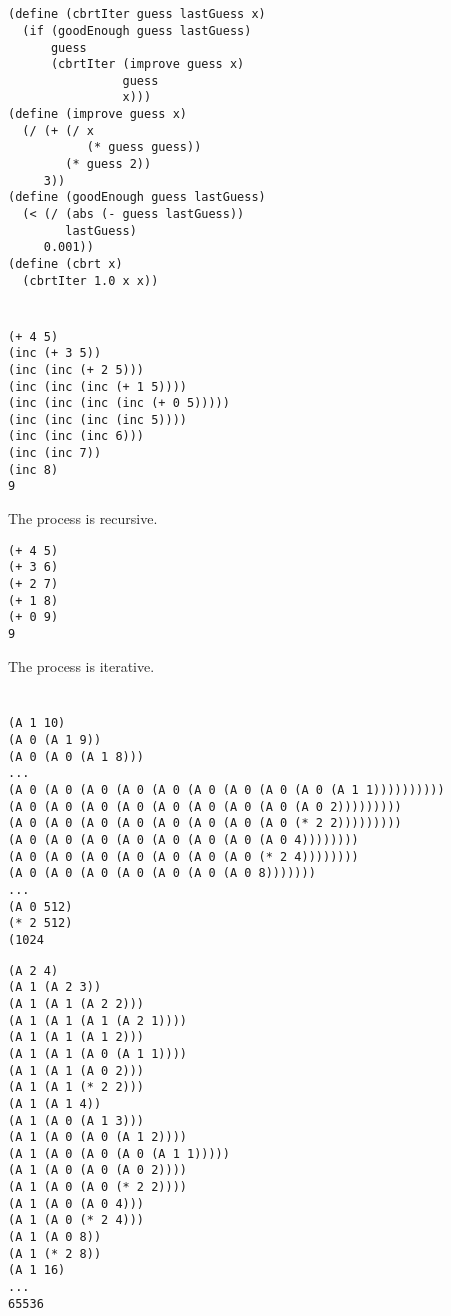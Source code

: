 \documentclass[a4paper]{report}
\begin{document}

\section{}

\begin{lstlisting}
(define (cbrtIter guess lastGuess x)
  (if (goodEnough guess lastGuess)
      guess
      (cbrtIter (improve guess x)
                guess
                x)))
(define (improve guess x)
  (/ (+ (/ x
           (* guess guess))
        (* guess 2))
     3))
(define (goodEnough guess lastGuess)
  (< (/ (abs (- guess lastGuess))
        lastGuess)
     0.001))
(define (cbrt x)
  (cbrtIter 1.0 x x))
\end{lstlisting}


\section{}

\begin{lstlisting}
(+ 4 5)
(inc (+ 3 5))
(inc (inc (+ 2 5)))
(inc (inc (inc (+ 1 5))))
(inc (inc (inc (inc (+ 0 5)))))
(inc (inc (inc (inc 5))))
(inc (inc (inc 6)))
(inc (inc 7))
(inc 8)
9
\end{lstlisting}

The process is recursive.

\begin{lstlisting}
(+ 4 5)
(+ 3 6)
(+ 2 7)
(+ 1 8)
(+ 0 9)
9
\end{lstlisting}

The process is iterative.


\section{}

\begin{lstlisting}
(A 1 10)
(A 0 (A 1 9))
(A 0 (A 0 (A 1 8)))
...
(A 0 (A 0 (A 0 (A 0 (A 0 (A 0 (A 0 (A 0 (A 0 (A 1 1))))))))))
(A 0 (A 0 (A 0 (A 0 (A 0 (A 0 (A 0 (A 0 (A 0 2)))))))))
(A 0 (A 0 (A 0 (A 0 (A 0 (A 0 (A 0 (A 0 (* 2 2)))))))))
(A 0 (A 0 (A 0 (A 0 (A 0 (A 0 (A 0 (A 0 4))))))))
(A 0 (A 0 (A 0 (A 0 (A 0 (A 0 (A 0 (* 2 4))))))))
(A 0 (A 0 (A 0 (A 0 (A 0 (A 0 (A 0 8)))))))
...
(A 0 512)
(* 2 512)
(1024
\end{lstlisting}

\begin{lstlisting}
(A 2 4)
(A 1 (A 2 3))
(A 1 (A 1 (A 2 2)))
(A 1 (A 1 (A 1 (A 2 1))))
(A 1 (A 1 (A 1 2)))
(A 1 (A 1 (A 0 (A 1 1))))
(A 1 (A 1 (A 0 2)))
(A 1 (A 1 (* 2 2)))
(A 1 (A 1 4))
(A 1 (A 0 (A 1 3)))
(A 1 (A 0 (A 0 (A 1 2))))
(A 1 (A 0 (A 0 (A 0 (A 1 1)))))
(A 1 (A 0 (A 0 (A 0 2))))
(A 1 (A 0 (A 0 (* 2 2))))
(A 1 (A 0 (A 0 4)))
(A 1 (A 0 (* 2 4)))
(A 1 (A 0 8))
(A 1 (* 2 8))
(A 1 16)
...
65536
\end{lstlisting}
\end{document}
